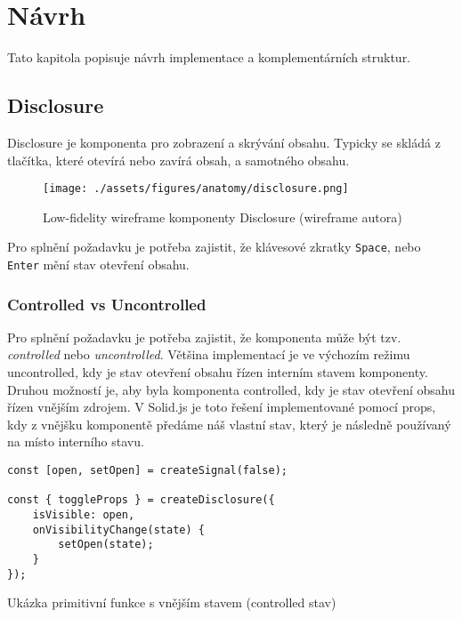 \chapter{Návrh}

Tato kapitola popisuje návrh implementace a komplementárních struktur.

\section{Disclosure}

Disclosure je komponenta pro zobrazení a skrývání obsahu.
Typicky se skládá z tlačítka, které otevírá nebo zavírá obsah, a samotného obsahu.

\begin{figure}[htp]
    \centering
    \texttt{[image: ./assets/figures/anatomy/disclosure.png]}
    \captionsetup{justification=centering}
    \caption[Low-fidelity wireframe komponenty Disclosure]{Low-fidelity wireframe komponenty Disclosure (wireframe autora)}
\end{figure}

Pro splnění požadavku \hyperref[ofr11]{} je potřeba zajistit, že klávesové zkratky \texttt{Space}, nebo \texttt{Enter} mění stav otevření obsahu.

\subsection{Controlled vs Uncontrolled}

Pro splnění požadavku \hyperref[dfr12]{} je potřeba zajistit, že komponenta může být tzv. \textit{controlled} nebo \textit{uncontrolled}.
Většina implementací je ve výchozím režimu uncontrolled, kdy je stav otevření obsahu řízen interním stavem komponenty.
Druhou možností je, aby byla komponenta controlled, kdy je stav otevření obsahu řízen vnějším zdrojem.
V Solid.js je toto řešení implementované pomocí props, kdy z vnějšku komponentě předáme náš vlastní stav, který je následně používaný na místo interního stavu.

\begin{listing}[!ht]
    \begin{verbatim}
const [open, setOpen] = createSignal(false);

const { toggleProps } = createDisclosure({
    isVisible: open,
    onVisibilityChange(state) {
        setOpen(state);
    }
});
\end{verbatim}
    \caption{Ukázka primitivní funkce s vnějším stavem (controlled stav)}
    \label{disclosure-controlled-vs-uncontrolled}
\end{listing}

